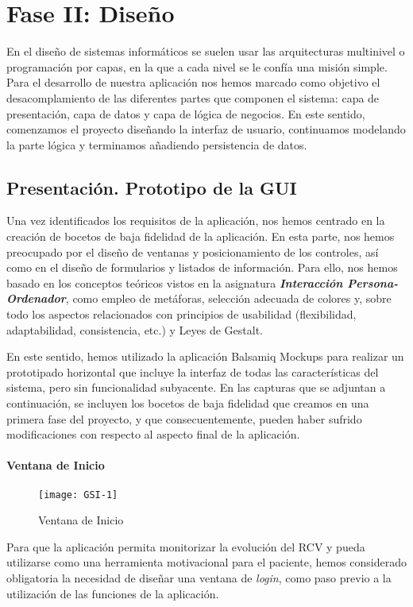 \chapter {Fase II: Diseño}
\label{cap:Fase II.Diseño}
En el diseño de sistemas informáticos se suelen usar las arquitecturas multinivel o programación por capas, en la que a cada nivel se le confía una misión simple. Para el desarrollo de nuestra aplicación nos hemos marcado como objetivo el desacomplamiento de las diferentes partes que componen el sistema: capa de presentación, capa de datos y capa de lógica de negocios. En este sentido, comenzamos el proyecto diseñando la interfaz de usuario, continuamos modelando la parte lógica y terminamos añadiendo persistencia de datos.

\section{Presentación. Prototipo de la GUI}

Una vez identificados los requisitos de la aplicación, nos hemos centrado en la creación de bocetos de baja fidelidad de la aplicación. En esta parte, nos hemos preocupado por el diseño de ventanas y posicionamiento de los controles, así como en el diseño de formularios y listados de información. Para ello, nos hemos basado en los conceptos teóricos vistos en la asignatura\textbf{\emph{ Interacción Persona-Ordenador}}, como empleo de metáforas, selección adecuada de colores y, sobre todo los aspectos relacionados con principios de usabilidad (flexibilidad, adaptabilidad, consistencia, etc.) y Leyes de Gestalt.

En este sentido, hemos utilizado la aplicación Balsamiq Mockups para realizar un prototipado horizontal que incluye la interfaz de todas las características del sistema, pero sin funcionalidad subyacente. En las capturas que se adjuntan a continuación, se incluyen los bocetos de baja fidelidad que creamos en una primera fase del proyecto, y que consecuentemente, pueden haber sufrido modificaciones con respecto al aspecto final de la aplicación. 


\subsubsection{Ventana de Inicio}
\begin{wrapfigure}{l}{0.3\linewidth}
    \centering
    \texttt{[image: GSI-1]}
    \caption{{Ventana de Inicio}}
    \label{fig:GES1}
\end{wrapfigure}
Para que la aplicación permita monitorizar la evolución del RCV y pueda utilizarse como una herramienta motivacional para el paciente, hemos considerado obligatoria la necesidad de diseñar una ventana de \emph{login}, como paso previo a la utilización de las funciones de la aplicación. 

